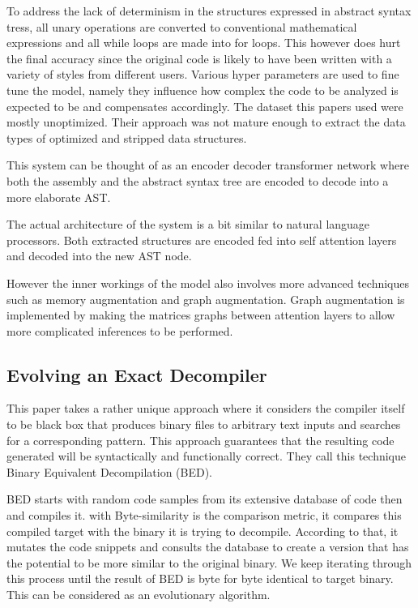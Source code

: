 \documentclass{article}
\begin{document}
To address the lack of determinism in the structures expressed in abstract syntax tress, all unary operations are converted to conventional mathematical expressions and all while loops are made into for loops.
This however does hurt the final accuracy since the original code is likely to have been written with a variety of styles from different users.
Various hyper parameters are used to fine tune the model, namely they influence how complex the code to be analyzed is expected to be and compensates accordingly.
The dataset this papers used were mostly unoptimized. Their approach was not mature enough to extract the data types of optimized and stripped data structures.

This system can be thought of as an encoder decoder transformer network where both the assembly and the abstract syntax tree are encoded to decode into a more elaborate AST.

The actual architecture of the system is a bit similar to natural language processors.
Both extracted structures are encoded fed into self attention layers and decoded into the new AST node.

However the inner workings of the model also involves more advanced techniques such as memory augmentation and graph augmentation.
Graph augmentation is implemented by making the matrices graphs between attention layers to allow more complicated inferences to be performed.


\subsection{Evolving an Exact Decompiler}

This paper takes a rather unique approach where it considers the compiler itself to be black box that produces binary files to arbitrary text inputs and searches for a corresponding pattern.
This approach guarantees that the resulting code generated will be syntactically and functionally correct.
They call this technique Binary Equivalent Decompilation (BED).

BED starts with random code samples from its extensive database of code then and compiles it.
with Byte-similarity is the comparison metric, it compares this compiled target with the binary it is trying to decompile.
According to that, it mutates the code snippets and consults the database to create a version that has the potential to be more similar to the original binary.
We keep iterating through this process until the result of BED is byte for byte identical to target binary.
This can be considered as an evolutionary algorithm.
\end{document}
